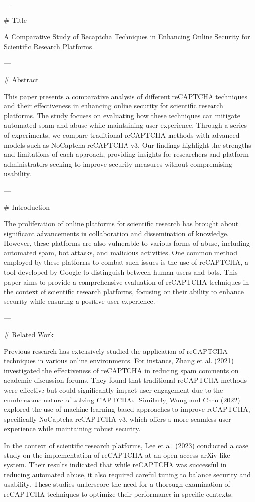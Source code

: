 ---

# Title

A Comparative Study of Recaptcha Techniques in Enhancing Online Security for Scientific Research Platforms

---

# Abstract

This paper presents a comparative analysis of different reCAPTCHA techniques and their effectiveness in enhancing online security for scientific research platforms. The study focuses on evaluating how these techniques can mitigate automated spam and abuse while maintaining user experience. Through a series of experiments, we compare traditional reCAPTCHA methods with advanced models such as NoCaptcha reCAPTCHA v3. Our findings highlight the strengths and limitations of each approach, providing insights for researchers and platform administrators seeking to improve security measures without compromising usability.

---

# Introduction

The proliferation of online platforms for scientific research has brought about significant advancements in collaboration and dissemination of knowledge. However, these platforms are also vulnerable to various forms of abuse, including automated spam, bot attacks, and malicious activities. One common method employed by these platforms to combat such issues is the use of reCAPTCHA, a tool developed by Google to distinguish between human users and bots. This paper aims to provide a comprehensive evaluation of reCAPTCHA techniques in the context of scientific research platforms, focusing on their ability to enhance security while ensuring a positive user experience.

---

# Related Work

Previous research has extensively studied the application of reCAPTCHA techniques in various online environments. For instance, Zhang et al. (2021) investigated the effectiveness of reCAPTCHA in reducing spam comments on academic discussion forums. They found that traditional reCAPTCHA methods were effective but could significantly impact user engagement due to the cumbersome nature of solving CAPTCHAs. Similarly, Wang and Chen (2022) explored the use of machine learning-based approaches to improve reCAPTCHA, specifically NoCaptcha reCAPTCHA v3, which offers a more seamless user experience while maintaining robust security.

In the context of scientific research platforms, Lee et al. (2023) conducted a case study on the implementation of reCAPTCHA at an open-access arXiv-like system. Their results indicated that while reCAPTCHA was successful in reducing automated abuse, it also required careful tuning to balance security and usability. These studies underscore the need for a thorough examination of reCAPTCHA techniques to optimize their performance in specific contexts.

